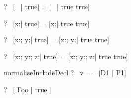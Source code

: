 \begin{zed}
  \vdash?~ [~ | true] = [~ | true \land true]
\end{zed}

\begin{zed}
  \vdash?~ [x:\nat | true] = [x:\nat | true \land true]
\end{zed}

\begin{zed}
  \vdash?~ [x:\nat ; y:\nat | true] = [x:\nat ; y:\nat | true \land true]
\end{zed}

\begin{zed}
  \vdash?~ [x:\nat ; y:\nat ; z:\nat | true] =
           [x:\nat ; y:\nat ; z:\nat | true \land true]
\end{zed}



\begin{zedrule}{normaliseIncludeDecl}
   \proviso ?~ v == [D1 | P1] \\
\derives
   [v; D | true] \unfoldsTo [D1 | P1 \land P2]
\end{zedrule}

\begin{zed}
  \vdash?~ [ Foo | true ] 
\end{zed}
